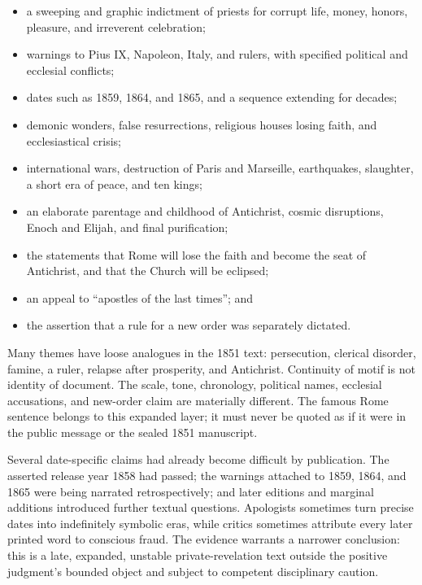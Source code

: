 \begin{itemize}
  \item a sweeping and graphic indictment of priests for corrupt life, money, honors, pleasure, and irreverent celebration;
  \item warnings to Pius IX, Napoleon, Italy, and rulers, with specified political and ecclesial conflicts;
  \item dates such as 1859, 1864, and 1865, and a sequence extending for decades;
  \item demonic wonders, false resurrections, religious houses losing faith, and ecclesiastical crisis;
  \item international wars, destruction of Paris and Marseille, earthquakes, slaughter, a short era of peace, and ten kings;
  \item an elaborate parentage and childhood of Antichrist, cosmic disruptions, Enoch and Elijah, and final purification;
  \item the statements that Rome will lose the faith and become the seat of Antichrist, and that the Church will be eclipsed;
  \item an appeal to ``apostles of the last times''; and
  \item the assertion that a rule for a new order was separately dictated.
\end{itemize}

Many themes have loose analogues in the 1851 text: persecution, clerical disorder, famine, a ruler, relapse after prosperity, and Antichrist. Continuity of motif is not identity of document. The scale, tone, chronology, political names, ecclesial accusations, and new-order claim are materially different. The famous Rome sentence belongs to this expanded layer; it must never be quoted as if it were in the public message or the sealed 1851 manuscript.

Several date-specific claims had already become difficult by publication. The asserted release year 1858 had passed; the warnings attached to 1859, 1864, and 1865 were being narrated retrospectively; and later editions and marginal additions introduced further textual questions. Apologists sometimes turn precise dates into indefinitely symbolic eras, while critics sometimes attribute every later printed word to conscious fraud. The evidence warrants a narrower conclusion: this is a late, expanded, unstable private-revelation text outside the positive judgment's bounded object and subject to competent disciplinary caution.

